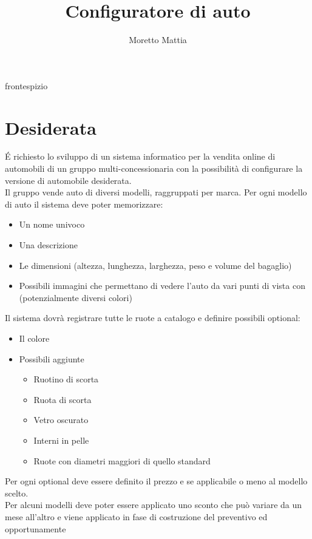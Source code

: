 \documentclass[a4paper, 11pt,oneside]{book}
\title{Configuratore di auto}
\author{Moretto Mattia}
\newcommand{\add}[1]{{#1}}
\begin{document}
\add{frontespizio}

\begingroup
    \hypersetup{hidelinks}
    \tableofcontents
\endgroup

\begingroup
    \hypersetup{hidelinks}
    \listoffigures
\endgroup


\chapter{Desiderata}
    \'E richiesto lo sviluppo di un sistema informatico per la vendita online di automobili di un gruppo multi-concessionaria con la possibilità di configurare la versione
    di automobile desiderata.\\
    Il gruppo vende auto di diversi modelli, raggruppati per marca. Per ogni modello di auto il sistema deve poter memorizzare:
    \begin{itemize}
        \item Un nome univoco
        \item Una descrizione
        \item Le dimensioni (altezza, lunghezza, larghezza, peso e volume del bagaglio)
        \item Possibili immagini che permettano di vedere l'auto da vari punti di vista con (potenzialmente diversi colori)
    \end{itemize}
    Il sistema dovrà registrare tutte le ruote a catalogo e definire possibili optional:
    \begin{itemize}
        \item Il colore
        \item Possibili aggiunte
        \begin{itemize}
            \item Ruotino di scorta
            \item Ruota di scorta
            \item Vetro oscurato
            \item Interni in pelle
            \item Ruote con diametri maggiori di quello standard
        \end{itemize}
    \end{itemize}
    Per ogni optional deve essere definito il prezzo e se applicabile o meno al modello scelto.\\
    Per alcuni modelli deve poter essere applicato uno sconto che può variare da un mese all'altro e viene applicato in fase di costruzione del preventivo ed opportunamente 
\end{document}
